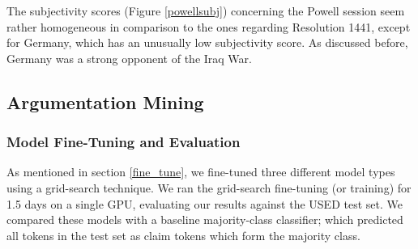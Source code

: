 The subjectivity scores (Figure \ref{powellsubj}) concerning the Powell session seem rather homogeneous in comparison to the ones regarding Resolution 1441, except for Germany, which has an unusually low subjectivity score. As discussed before, Germany was a strong opponent of the Iraq War.

\subsection{Argumentation Mining}
\subsubsection{Model Fine-Tuning and Evaluation}

As mentioned in section \ref{fine_tune}, we fine-tuned three different model types using a grid-search technique. We ran the grid-search fine-tuning (or training) for 1.5 days on a single GPU, evaluating our results against the USED test set. We compared these models with a baseline majority-class classifier; which predicted all tokens in the test set as claim tokens which form the majority class.

